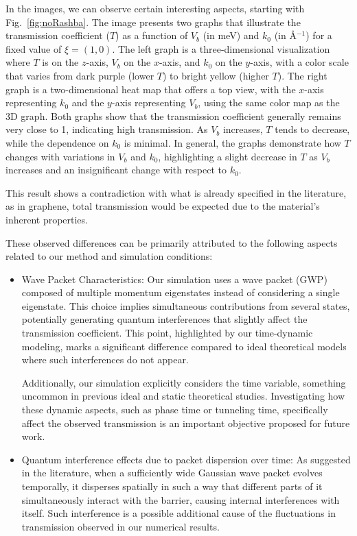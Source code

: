 In the images, we can observe certain interesting aspects, starting with Fig.~\ref{fig:noRashba}.
The image presents two graphs that illustrate the transmission coefficient ($T$) as a function of $V_b$ (in meV) and $k_0$ (in \AA$^{-1}$) for a fixed value of $\xi = (1, 0)$.
The left graph is a three-dimensional visualization where $T$ is on the $z$-axis, $V_b$ on the $x$-axis, and $k_0$ on the $y$-axis, with a color scale that varies from dark purple (lower $T$) to bright yellow (higher $T$).
The right graph is a two-dimensional heat map that offers a top view, with the $x$-axis representing $k_0$ and the $y$-axis representing $V_b$, using the same color map as the 3D graph.
Both graphs show that the transmission coefficient generally remains very close to 1, indicating high transmission.
As $V_b$ increases, $T$ tends to decrease, while the dependence on $k_0$ is minimal.
In general, the graphs demonstrate how $T$ changes with variations in $V_b$ and $k_0$, highlighting a slight decrease in $T$ as $V_b$ increases and an insignificant change with respect to $k_0$.

This result shows a contradiction with what is already specified in the literature, as in graphene, total transmission would be expected due to the material's inherent properties\cite{horsell2008, Young2009}.

These observed differences can be primarily attributed to the following aspects related to our method and simulation conditions:

\begin{itemize}
    \item Wave Packet Characteristics:
    Our simulation uses a wave packet (GWP) composed of multiple momentum eigenstates instead of considering a single eigenstate.
    This choice implies simultaneous contributions from several states, potentially generating quantum interferences that slightly affect the transmission coefficient\cite{Staelens2021}.
    This point, highlighted by our time-dynamic modeling, marks a significant difference compared to ideal theoretical models where such interferences do not appear.

    Additionally, our simulation explicitly considers the time variable, something uncommon in previous ideal and static theoretical studies.
    Investigating how these dynamic aspects, such as phase time or tunneling time, specifically affect the observed transmission is an important objective proposed for future work.

    \item Quantum interference effects due to packet dispersion over time:
    As suggested in the literature\cite{MolgadoMex2018}, when a sufficiently wide Gaussian wave packet evolves temporally, it disperses spatially in such a way that different parts of it simultaneously interact with the barrier, causing internal interferences with itself.
    Such interference is a possible additional cause of the fluctuations in transmission observed in our numerical results.
\end{itemize}

